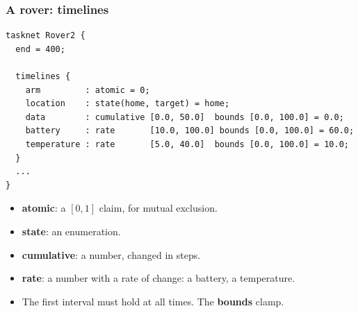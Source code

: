 \begin{frame}[fragile]
  \frametitle{A rover: timelines} \small

\begin{lstlisting}[basicstyle=\ttfamily\tiny]
tasknet Rover2 {
  end = 400;

  timelines {
    arm         : atomic = 0;
    location    : state(home, target) = home;
    data        : cumulative [0.0, 50.0]  bounds [0.0, 100.0] = 0.0;
    battery     : rate       [10.0, 100.0] bounds [0.0, 100.0] = 60.0;
    temperature : rate       [5.0, 40.0]  bounds [0.0, 100.0] = 10.0;
  }
  ...
}
\end{lstlisting}

\vspace{0.2cm}
\begin{itemize}
\item {\bf atomic}: a $[0,1]$ claim, for mutual exclusion.
\item {\bf state}: an enumeration.
\item {\bf cumulative}: a number, changed in steps.
\item {\bf rate}: a number with a rate of change: a battery, a temperature.
\item The first interval must hold at all times. The {\bf bounds} clamp.
\end{itemize}

\end{frame}

